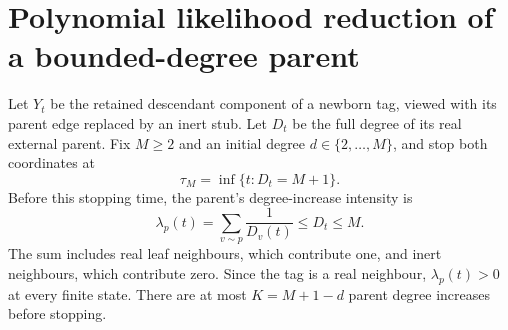 \section{Polynomial likelihood reduction of a bounded-degree parent}
\label{plc:section}

Let $Y_t$ be the retained descendant component of a newborn tag, viewed
with its parent edge replaced by an inert stub.  Let $D_t$ be the full
degree of its real external parent.  Fix $M\ge2$ and an initial degree
$d\in\{2,\ldots,M\}$, and stop both coordinates at
\[
 \tau_M=\inf\{t:D_t=M+1\}.
\]
Before this stopping time, the parent's degree-increase intensity is
\[
 \lambda_p(t)=\sum_{v\sim p}\frac1{D_v(t)}\le D_t\le M.
\]
The sum includes real leaf neighbours, which contribute one, and
inert neighbours, which contribute zero.  Since the tag is a real
neighbour, $\lambda_p(t)>0$ at every finite state.
There are at most $K=M+1-d$ parent degree increases before stopping.

